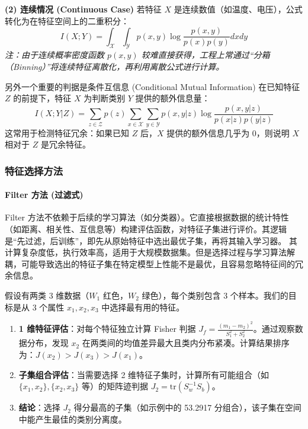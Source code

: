 \textbf{(2) 连续情况 (Continuous Case)}
若特征 $X$ 是连续数值（如温度、电压），公式转化为在特征空间上的二重积分：
\[ I(X;Y) = \int_{\mathcal{X}} \int_{\mathcal{Y}} p(x,y) \log \frac{p(x,y)}{p(x)p(y)} dx dy \]
\textit{注：由于连续概率密度函数 $p(x,y)$ 较难直接获得，工程上常通过“分箱（Binning）”将连续特征离散化，再利用离散公式进行计算。}

另外一个重要的判据是条件互信息 (Conditional Mutual Information)
在已知特征 $Z$ 的前提下，特征 $X$ 为判断类别 $Y$ 提供的额外信息量：
\[ I(X;Y|Z) = \sum_{z \in \mathcal{Z}} p(z) \sum_{x \in \mathcal{X}} \sum_{y \in \mathcal{Y}} p(x,y|z) \log \frac{p(x,y|z)}{p(x|z)p(y|z)} \]
这常用于检测特征冗余：如果已知 $Z$ 后，$X$ 提供的额外信息几乎为 0，则说明 $X$ 相对于 $Z$ 是冗余特征。


\subsubsection{特征选择方法}
\paragraph{Filter 方法 (过滤式)}
Filter 方法不依赖于后续的学习算法（如分类器）。它直接根据数据的统计特性（如距离、相关性、互信息等）构建评估函数，对特征子集进行评价。其逻辑是“先过滤，后训练”，即先从原始特征中选出最优子集，再将其输入学习器。
其计算复杂度低，执行效率高，适用于大规模数据集。但是选择过程与学习算法解耦，可能导致选出的特征子集在特定模型上性能不是最优，且容易忽略特征间的冗余信息。


\begin{example}[基于距离评价的特征选择流程]
    假设有两类 3 维数据（$W_1$ 红色，$W_2$ 绿色），每个类别包含 3 个样本。我们的目标是从 3 个属性 $x_1, x_2, x_3$ 中选择最有用的特征。
    
    \begin{enumerate}
        \item \textbf{1 维特征评估}：对每个特征独立计算 Fisher 判据 $J_f = \frac{(m_1 - m_2)^2}{S_1^2 + S_2^2}$。通过观察数据分布，发现 $x_2$ 在两类间的均值差异最大且类内分布紧凑。计算结果排序为：$J(x_2) > J(x_3) > J(x_1)$。
        \item \textbf{子集组合评估}：当需要选择 2 维特征子集时，计算所有可能组合（如 $\{x_1, x_2\}, \{x_2, x_3\}$ 等）的矩阵迹判据 $J_2 = \text{tr}(S_w^{-1} S_b)$。
        \item \textbf{结论}：选择 $J_2$ 得分最高的子集（如示例中的 53.2917 分组合），该子集在空间中能产生最佳的类别分离度。
    \end{enumerate}

\end{example}

